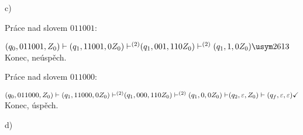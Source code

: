 c) 

\begin{multicols}{2} 

    Práce nad slovem $011001$: 

    $
    {(q_0, 011001, Z_0) \vdash (q_1, 11001, 0Z_0) \vdash^{(2)} }\\
    {(q_1, 001, 110Z_0) \vdash^{(2)} (q_1, 1, 0Z_0)} \xmark\\
    $Konec, neúspěch.

    Práce nad slovem $011000$: 

    $
    {(q_0, 011000, Z_0) \vdash (q_1, 11000, 0Z_0) \vdash^{(2)}}\\
    {(q_1, 000, 110Z_0) \vdash^{(2)} (q_1, 0, 0Z_0) \vdash}\\
    {(q_2, \varepsilon, Z_0) \vdash (q_f, \varepsilon, \varepsilon)} \checkmark\\
    $Konec, úspěch.

\end{multicols}

d) %
